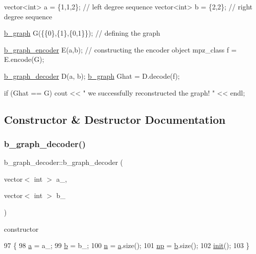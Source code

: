 \begin{DoxyCode}
vector<int> a = \{1,1,2\}; \textcolor{comment}{// left degree sequence }
vector<int> b = \{2,2\}; \textcolor{comment}{// right degree sequence}

\hyperlink{classb__graph}{b\_graph} G(\{\{0\},\{1\},\{0,1\}\}); \textcolor{comment}{// defining the graph}

\hyperlink{classb__graph__encoder}{b\_graph\_encoder} E(a,b); \textcolor{comment}{// constructing the encoder object}
mpz\_class f = E.encode(G);

\hyperlink{classb__graph__decoder}{b\_graph\_decoder} D(a, b);
\hyperlink{classb__graph}{b\_graph} Ghat = D.decode(f);

\textcolor{keywordflow}{if} (Ghat == G)
   cout << \textcolor{stringliteral}{" we successfully reconstructed the graph! "} << endl;
\end{DoxyCode}
 

\subsection{Constructor \& Destructor Documentation}
\mbox{\label{classb__graph__decoder_a2284e65bb4fcdd9356fc6a3109c2a4a7}} 
\subsubsection{\texorpdfstring{b\+\_\+graph\+\_\+decoder()}{b\_graph\_decoder()}}
{\footnotesize\ttfamily b\+\_\+graph\+\_\+decoder\+::b\+\_\+graph\+\_\+decoder (\begin{DoxyParamCaption}\item[{vector$<$ int $>$}]{a\+\_\+,  }\item[{vector$<$ int $>$}]{b\+\_\+ }\end{DoxyParamCaption})}



constructor 


\begin{DoxyCode}
97 \{
98   \hyperlink{classb__graph__decoder_afcf783e4199fb8f9d6828db08bb12333}{a} = a\_;
99   \hyperlink{classb__graph__decoder_a12d1a4a91f342111d2116196cb826317}{b} = b\_;
100   \hyperlink{classb__graph__decoder_a2caddd63df6808c95e2ee738f7c77870}{n} = \hyperlink{classb__graph__decoder_afcf783e4199fb8f9d6828db08bb12333}{a}.size();
101   \hyperlink{classb__graph__decoder_a7eca48cf8793e722d1b29dbdc9fd2dca}{np} = \hyperlink{classb__graph__decoder_a12d1a4a91f342111d2116196cb826317}{b}.size();
102   \hyperlink{classb__graph__decoder_a9498e8aa7391480cc663bffef3718c6b}{init}();
103 \}
\end{DoxyCode}


